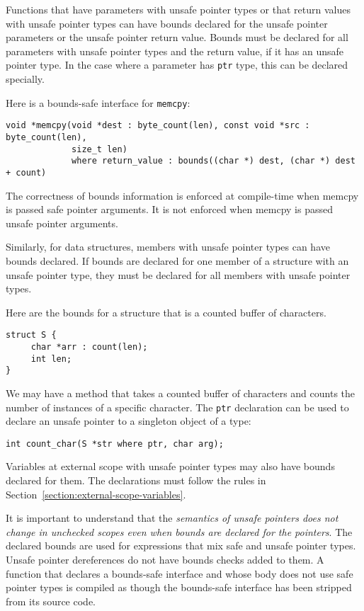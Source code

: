 Functions that have parameters with unsafe pointer types or that return
values with unsafe pointer types can have bounds declared for the unsafe
pointer parameters or the unsafe pointer return value. Bounds must be
declared for all parameters with unsafe pointer types and the return
value, if it has an unsafe pointer type. In the case where a parameter
has \texttt{ptr} type, this can be declared specially.

Here is a bounds-safe interface for \texttt{memcpy}:
\begin{verbatim}
void *memcpy(void *dest : byte_count(len), const void *src : byte_count(len), 
             size_t len) 
             where return_value : bounds((char *) dest, (char *) dest + count)
\end{verbatim}

The correctness of bounds information is enforced at compile-time when
memcpy is passed safe pointer arguments. It is not enforced when memcpy
is passed unsafe pointer arguments.

Similarly, for data structures, members with unsafe pointer types can
have bounds declared. If bounds are declared for one member of a
structure with an unsafe pointer type, they must be declared for all
members with unsafe pointer types.

Here are the bounds for a structure that is a counted buffer of
characters.
\begin{verbatim}
struct S {
     char *arr : count(len);
     int len;
}
\end{verbatim}

We may have a method that takes a counted buffer of characters and
counts the number of instances of a specific character. The \texttt{ptr}
declaration can be used to declare an unsafe pointer to a singleton
object of a type:
\begin{verbatim}
int count_char(S *str where ptr, char arg);
\end{verbatim}

Variables at external scope with unsafe pointer types may also have 
bounds declared for them.   The declarations must follow the 
rules in Section~\ref{section:external-scope-variables}.

It is important to understand that the \emph{semantics of unsafe
pointers does not change in unchecked scopes even when bounds are
declared for the pointers}. The declared bounds are used  for expressions
that mix safe and unsafe pointer types. Unsafe pointer dereferences do not
have bounds checks added to them. A function that declares a bounds-safe 
interface and whose body does not use safe pointer
types is compiled as though the bounds-safe interface has been
stripped from its source code.

